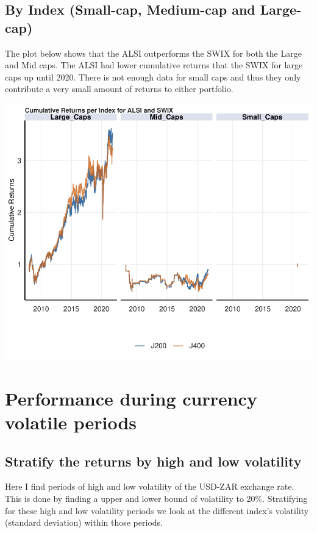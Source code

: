 \documentclass[11pt,preprint, authoryear]{elsarticle}
\numberwithin{equation}{section}
\numberwithin{figure}{section}
\numberwithin{table}{section}
\begin{document}
\hypertarget{by-index-small-cap-medium-cap-and-large-cap}{%
\subsection{By Index (Small-cap, Medium-cap and
Large-cap)}\label{by-index-small-cap-medium-cap-and-large-cap}}

The plot below shows that the ALSI outperforms the SWIX for both the
Large and Mid caps. The ALSI had lower cumulative returns that the SWIX
for large caps up until 2020. There is not enough data for small caps
and thus they only contribute a very small amount of returns to either
portfolio.

\includegraphics{Question3_files/figure-latex/unnamed-chunk-10-1.pdf}

\hypertarget{performance-during-currency-volatile-periods}{%
\section{Performance during currency volatile
periods}\label{performance-during-currency-volatile-periods}}

\hypertarget{stratify-the-returns-by-high-and-low-volatility}{%
\subsection{Stratify the returns by high and low
volatility}\label{stratify-the-returns-by-high-and-low-volatility}}

Here I find periods of high and low volatility of the USD-ZAR exchange
rate. This is done by finding a upper and lower bound of volatility to
20\%. Stratifying for these high and low volatility periods we look at
the different index's volatility (standard deviation) within those
periods.
\end{document}
